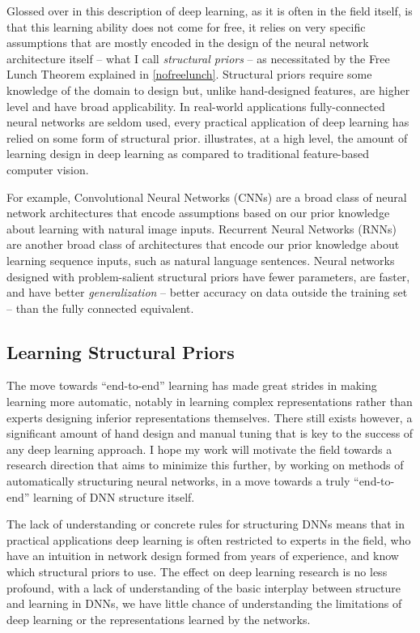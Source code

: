 \documentclass[thesis]{subfiles}
\begin{document}
Glossed over in this description of deep learning, as it is often in the field itself, is that this learning ability does not come for free, it relies on very specific assumptions that are mostly encoded in the design of the neural network architecture itself -- what I call \emph{structural priors} -- as necessitated by the Free Lunch Theorem explained in \cref{nofreelunch}. Structural priors require some knowledge of the domain to design but, unlike hand-designed features, are higher level and have broad applicability. In real-world applications fully-connected neural networks are seldom used, every practical application of deep learning has relied on some form of structural prior.  illustrates, at a high level, the amount of learning \vs design in deep learning as compared to traditional feature-based computer vision.

For example, Convolutional Neural Networks (CNNs) are a broad class of neural network architectures that encode assumptions based on our prior knowledge about learning with natural image inputs. Recurrent Neural Networks (RNNs) are another broad class of architectures that encode our prior knowledge about learning sequence inputs, such as natural language sentences. Neural networks designed with problem-salient structural priors have fewer parameters, are faster, and have better \emph{generalization} -- better accuracy on data outside the training set -- than the fully connected equivalent.

\subsection{Learning Structural Priors}
The move towards ``end-to-end'' learning has made great strides in making learning more automatic, notably in learning complex representations rather than experts designing inferior representations themselves. There still exists however, a significant amount of hand design and manual tuning that is key to the success of any deep learning approach. I hope my work will motivate the field towards a research direction that aims to minimize this further, by working on methods of automatically structuring neural networks, in a move towards a truly ``end-to-end'' learning of DNN structure itself.

The lack of understanding or concrete rules for structuring DNNs means that in practical applications deep learning is often restricted to experts in the field, who have an intuition in network design formed from years of experience, and know which structural priors to use. The effect on deep learning research is no less profound, with a lack of understanding of the basic interplay between structure and learning in DNNs, we have little chance of understanding the limitations of deep learning or the representations learned by the networks. 
\end{document}
